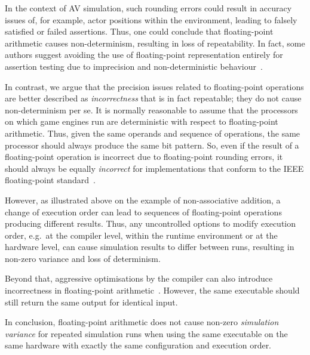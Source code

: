 \documentclass[runningheads,twocolumn,a4paper,10pt]{llncs}
\begin{document}
In the context of AV simulation, such rounding errors could result in accuracy issues of, for example, actor positions within the environment, leading to falsely satisfied or failed assertions.
%
Thus, one could conclude that floating-point arithmetic causes non-determinism, resulting in loss of repeatability. In fact, some authors suggest avoiding the use of floating-point representation entirely for assertion testing due to imprecision and non-deterministic behaviour~\cite{empirical-analysis-of-flaky-tests}. 


In contrast, we argue that the precision issues related to floating-point operations are better described as \textit{incorrectness} that is in fact repeatable; they do not cause non-determinism per se. 
%
It is normally reasonable to assume that the processors on which game engines run are deterministic with respect to floating-point arithmetic. 
%
Thus, given the same operands and sequence of operations, the same processor should always produce the same bit pattern. %
%
So, even if the result of a floating-point operation is incorrect due to floating-point rounding errors, it should always be equally \textit{incorrect} for implementations that conform to the IEEE floating-point standard~\cite{8766229}.

However, as illustrated above on the example of non-associative addition, a change of execution order can lead to sequences of floating-point operations producing different results. Thus, any uncontrolled options to modify execution order, e.g.\ at the compiler level, within the runtime environment or at the hardware level, can cause simulation results to differ between runs, resulting in non-zero variance and loss of determinism. 
 
Beyond that, aggressive optimisations by the compiler can also introduce incorrectness in floating-point arithmetic~\cite{llvm-floating-point}. However, the same executable should still return the same output for identical input. 

In conclusion, floating-point arithmetic does not cause non-zero \textit{simulation variance} for repeated simulation runs when using the same executable on the same hardware with exactly the same configuration and execution order.
\end{document}
